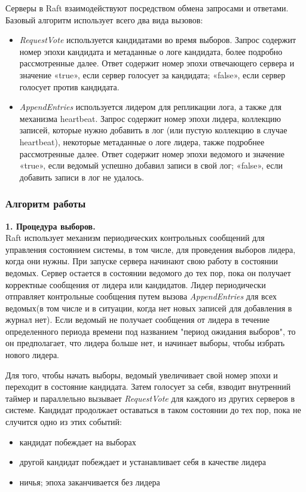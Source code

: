 \documentclass[subf, href, colorlinks=true, 14pt,
times, mtpro, specialist]{disser}
\theoremstyle{definition}
\begin{document}
Серверы в Raft взаимодействуют посредством обмена запросами и ответами. Базовый алгоритм использует всего два вида вызовов: 
\begin{itemize}
\item \emph{RequestVote} используется кандидатами во время выборов. Запрос содержит номер эпохи кандидата и метаданные о логе кандидата, более подробно рассмотренные далее. Ответ содержит номер эпохи отвечающего сервера и значение «true», если сервер голосует за кандидата; «false», если сервер голосует против кандидата.
\item \emph{AppendEntries} используется лидером для репликации лога, а также для механизма heartbeat. Запрос содержит номер эпохи лидера, коллекцию записей, которые нужно добавить в лог (или пустую коллекцию в случае heartbeat), некоторые метаданные о логе лидера, также подробнее рассмотренные далее. Ответ содержит номер эпохи ведомого и значение «true», если ведомый успешно добавил записи в свой лог; «false», если добавить записи в лог не удалось.
\end{itemize}

\subsubsection{Алгоритм  работы}

\textbf{1. Процедура выборов.}\\
Raft использует механизм периодических контрольных сообщений для управления состоянием системы, в том числе, для проведения выборов лидера, когда они нужны. При запуске сервера начинают свою работу в состоянии ведомых. Сервер остается в состоянии ведомого до тех пор, пока он получает корректные сообщения от лидера или кандидатов. Лидер периодически отправляет контрольные сообщения путем вызова \emph{AppendEntries} для всех ведомых(в том числе и в ситуации, когда нет новых записей для добавления в журнал нет). Если ведомый не получает сообщения от лидера в течение определенного периода времени под названием "период ожидания выборов", то он предполагает, что лидера
больше нет, и начинает выборы, чтобы избрать нового лидера. 

Для того, чтобы начать выборы, ведомый увеличивает свой номер эпохи и переходит в состояние кандидата. Затем голосует за себя, взводит внутренний таймер и параллельно вызывает \emph{RequestVote} для каждого из других серверов в системе. Кандидат продолжает оставаться в таком состоянии до тех пор, пока не случится одно из этих событий:
\begin{itemize}
\item кандидат побеждает на выборах
\item другой кандидат побеждает и устанавливает себя в качестве лидера
\item ничья; эпоха заканчивается без лидера
\end{itemize}
\end{document}
